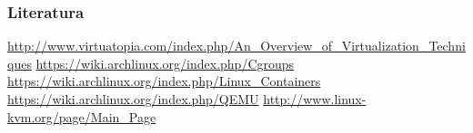 \documentclass[t]{beamer}
\begin{document}
\begin{frame}
	\frametitle{Literatura}
	\url{http://www.virtuatopia.com/index.php/An_Overview_of_Virtualization_Techniques}
	\vfill
	\url{https://wiki.archlinux.org/index.php/Cgroups}
	\url{https://wiki.archlinux.org/index.php/Linux_Containers}
	\url{https://wiki.archlinux.org/index.php/QEMU}
	\url{http://www.linux-kvm.org/page/Main_Page}
\end{frame}
\end{document}
